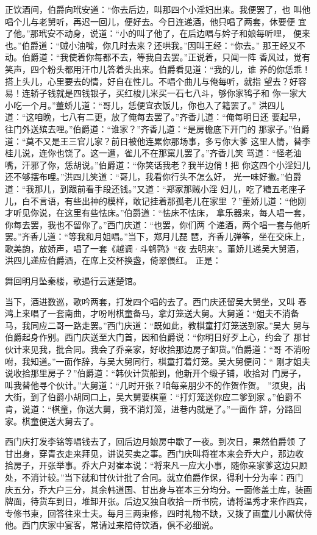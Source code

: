 正饮酒间，伯爵向玳安道：“你去后边，叫那四个小淫妇出来。我便罢了，也
叫他唱个儿与老舅听，再迟一回儿，便好去。今日连递酒，他只唱了两套，休要便
宜了他。”那玳安不动身，说道：“小的叫了他了，在后边唱与妗子和娘每听哩，
便来也。”伯爵道：“贼小油嘴，你几时去来？还哄我。”因叫王经：“你去。”
那王经又不动。伯爵道：“我使着你每都不去，等我自去罢。”正说着，只闻一阵
香风过，觉有笑声，四个粉头都用汗巾儿答着头出来。伯爵看见道：“我的儿，谁
养的你恁乖！搭上头儿，心里要去的情，好自在性儿。不唱个曲儿与俺每听，就指
望去？好容易！连轿子钱就是四钱银子，买红梭儿米买一石七八斗，够你家鸨子和
你一家大小吃一个月。”董娇儿道：“哥儿，恁便宜衣饭儿，你也入了籍罢了。”
洪四儿道：“这咱晚，七八有二更，放了俺每去罢了。”齐香儿道：“俺每明日还
要起早，往门外送殡去哩。”伯爵道：“谁家？”齐香儿道：“是房檐底下开门的
那家子。”伯爵道：“莫不又是王三官儿家？前日被他连累你那场事，多亏你大爹
这里人情，替李桂儿说，连你也饶了。这一遭，雀儿不在那窠儿罢了。”齐香儿笑
骂道：“怪老油嘴，汗邪了你，恁胡说。”伯爵道：“你笑话我老？我半边俏！把
你这四个小淫妇儿还不够摆布哩。”洪四儿笑道：“哥儿，我看你行头不怎么好，
光一味好撇。”伯爵道：“我那儿，到跟前看手段还钱。”又道：“郑家那贼小淫
妇儿，吃了糖五老座子儿，白不言语，有些出神的模样，敢记挂着那孤老儿在家里
？”董娇儿道：“他刚才听见你说，在这里有些怯床。”伯爵道：“怯床不怯床，
拿乐器来，每人唱一套，你每去罢，我也不留你了。”西门庆道：“也罢，你们两
个递酒，两个唱一套与他听罢。”齐香儿道：“等我和月姐唱。”当下，郑月儿琵
琶，齐香儿弹筝，坐在交床上，歌美韵，放娇声，唱了一套《越调·斗鹌鹑》“夜
去明来”。董娇儿递吴大舅酒，洪四儿递应伯爵酒，在席上交杯换盏，倚翠偎红。
正是：

舞回明月坠秦楼，歌遏行云迷楚馆。

当下，酒进数巡，歌吟两套，打发四个唱的去了。西门庆还留吴大舅坐，又叫
春鸿上来唱了一套南曲，才吩咐棋童备马，拿灯笼送大舅。大舅道：“姐夫不消备
马，我同应二哥一路走罢。”西门庆道：“既如此，教棋童打灯笼送到家。”吴大
舅与伯爵起身作别。西门庆送至大门首，因和伯爵说：“你明日好歹上心，约会了
那甘伙计来见我，批合同。我会了乔亲家，好收拾那边房子卸货。”伯爵道：“哥
不消吩咐，我知道。”一面作辞，与吴大舅同行，棋童打着灯笼。吴大舅便问：“
刚才姐夫说收拾那里房子？”伯爵道：“韩伙计货船到，他新开个缎子铺，收拾对
门房子，叫我替他寻个伙计。”大舅道：“几时开张？咱每亲朋少不的作贺作贺。
”须臾，出大街，到了伯爵小胡同口上，吴大舅要棋童：“打灯笼送你应二爹到家
。”伯爵不肯，说道：“棋童，你送大舅，我不消灯笼，进巷内就是了。”一面作
辞，分路回家。棋童便送大舅去了。

西门庆打发李铭等唱钱去了，回后边月娘房中歇了一夜。到次日，果然伯爵领
了甘出身，穿青衣走来拜见，讲说买卖之事。西门庆叫将崔本来会乔大户，那边收
拾房子，开张举事。乔大户对崔本说：“将来凡一应大小事，随你亲家爹这边只顾
处，不消计较。”当下就和甘伙计批了合同。就立伯爵作保，得利十分为率：西门
庆五分，乔大户三分，其余韩道国、甘出身与崔本三分均分。一面修盖土库，装画
牌面，待货车到日，堆卸开张。后边又独自收拾一所书院，请将温秀才来作西宾，
专修书柬，回答往来士夫。每月三两束修，四时礼物不缺，又拨了画童儿小厮伏侍
他。西门庆家中宴客，常请过来陪侍饮酒，俱不必细说。

